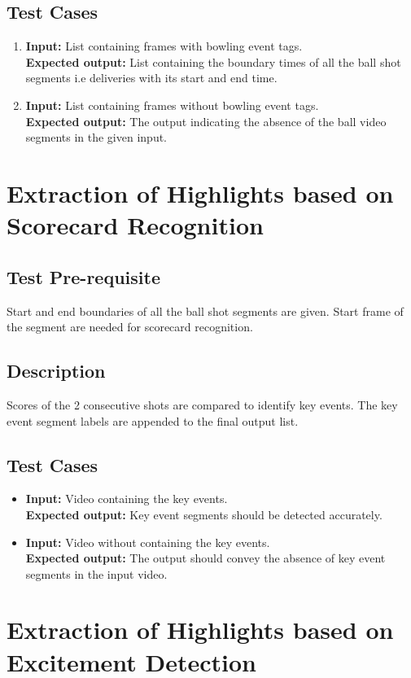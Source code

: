 \subsection{Test Cases}
\begin{enumerate}
\item \textbf{Input:} List containing frames with bowling event tags.\\
\indent\textbf{Expected output:} List containing the boundary times of all the ball shot segments i.e deliveries with its start and end time.
\item \textbf{Input:} List containing frames without bowling event tags.\\
\indent\textbf{Expected output:} The output indicating the absence of the ball video segments in the given input.
\end{enumerate}

\section{Extraction of Highlights based on Scorecard Recognition}
\subsection{Test Pre-requisite}
Start and end boundaries of all the ball shot segments are given. Start frame of the segment are needed for scorecard recognition.
\subsection{Description}
Scores of the 2 consecutive shots are compared to identify key events. The key event segment labels are appended to the final output list.
\subsection{Test Cases}
\begin{itemize}
\item \textbf{Input:} Video containing the key events.\\
 \indent\textbf{Expected output:} Key event segments should be detected accurately.
\item \textbf{Input:} Video without containing the key events.\\
 \indent\textbf{Expected output:} The output should convey the absence of key event segments in the input video.
\end{itemize}
\section{Extraction of Highlights based on Excitement Detection}

